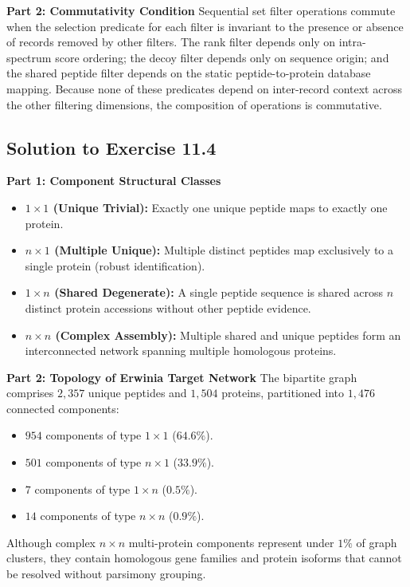 \documentclass[11pt,twoside,openright]{book}
\begin{document}
\noindent\textbf{Part 2: Commutativity Condition}\enspace
Sequential set filter operations commute when the selection predicate for each filter is invariant to the presence or absence of records removed by other filters. The rank filter depends only on intra-spectrum score ordering; the decoy filter depends only on sequence origin; and the shared peptide filter depends on the static peptide-to-protein database mapping. Because none of these predicates depend on inter-record context across the other filtering dimensions, the composition of operations is commutative.

\subsection{Solution to Exercise 11.4}

\noindent\textbf{Part 1: Component Structural Classes}\enspace
\begin{itemize}
    \item \textbf{$1 \times 1$ (Unique Trivial):} Exactly one unique peptide maps to exactly one protein.
    \item \textbf{$n \times 1$ (Multiple Unique):} Multiple distinct peptides map exclusively to a single protein (robust identification).
    \item \textbf{$1 \times n$ (Shared Degenerate):} A single peptide sequence is shared across $n$ distinct protein accessions without other peptide evidence.
    \item \textbf{$n \times n$ (Complex Assembly):} Multiple shared and unique peptides form an interconnected network spanning multiple homologous proteins.
\end{itemize}

\noindent\textbf{Part 2: Topology of Erwinia Target Network}\enspace
The bipartite graph comprises $2,357$ unique peptides and $1,504$ proteins, partitioned into $1,476$ connected components:
\begin{itemize}
    \item $954$ components of type $1 \times 1$ ($64.6\%$).
    \item $501$ components of type $n \times 1$ ($33.9\%$).
    \item $7$ components of type $1 \times n$ ($0.5\%$).
    \item $14$ components of type $n \times n$ ($0.9\%$).
\end{itemize}
Although complex $n \times n$ multi-protein components represent under $1\%$ of graph clusters, they contain homologous gene families and protein isoforms that cannot be resolved without parsimony grouping.
\end{document}
